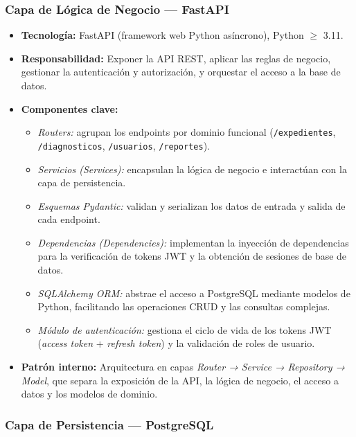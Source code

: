 \subsubsection*{Capa de Lógica de Negocio — FastAPI}

\begin{itemize}
	\item \textbf{Tecnología:} FastAPI (framework web Python asíncrono), Python
	$\geq$ 3.11.
	\item \textbf{Responsabilidad:} Exponer la API REST, aplicar las reglas de negocio,
	gestionar la autenticación y autorización, y orquestar el acceso a la base de
	datos.
	\item \textbf{Componentes clave:}
	\begin{itemize}
		\item \textit{Routers:} agrupan los endpoints por dominio funcional
		(\texttt{/expedientes}, \texttt{/diagnosticos}, \texttt{/usuarios},
		\texttt{/reportes}).
		\item \textit{Servicios (Services):} encapsulan la lógica de negocio e
		interactúan con la capa de persistencia.
		\item \textit{Esquemas Pydantic:} validan y serializan los datos de entrada y
		salida de cada endpoint.
		\item \textit{Dependencias (Dependencies):} implementan la inyección de
		dependencias para la verificación de tokens JWT y la obtención de sesiones
		de base de datos.
		\item \textit{SQLAlchemy ORM:} abstrae el acceso a PostgreSQL mediante modelos
		de Python, facilitando las operaciones CRUD y las consultas complejas.
		\item \textit{Módulo de autenticación:} gestiona el ciclo de vida de los tokens
		JWT (\textit{access token} + \textit{refresh token}) y la validación de
		roles de usuario.
	\end{itemize}
	\item \textbf{Patrón interno:} Arquitectura en capas
	\textit{Router → Service → Repository → Model}, que separa la exposición de
	la API, la lógica de negocio, el acceso a datos y los modelos de dominio.
\end{itemize}

\subsubsection*{Capa de Persistencia — PostgreSQL}

